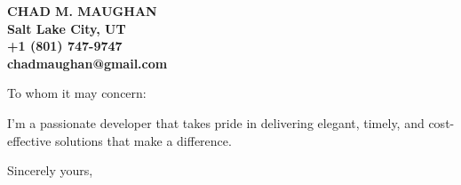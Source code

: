 \documentclass[letterpaper]{letter}
\begin{document}
\signature{Chad M. Maughan}                  					%
\let\raggedleft\raggedright                						%
 
\begin{letter} {}

\begin{center}
\large\bf CHAD M. MAUGHAN \\
Salt Lake City, UT \\
+1 (801) 747-9747 \\
chadmaughan@gmail.com
\end{center}

\vspace{2em}

\opening{To whom it may concern:}
\vspace{1em}

I'm a passionate developer that takes pride in delivering elegant, timely, and cost-effective solutions that make a difference.


\closing{Sincerely yours,}
 
\end{letter}
 
\end{document}
